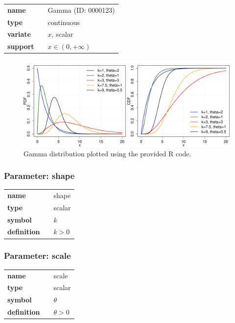 \begin{tabular}{p{2cm}cl}
\textbf{name} & & Gamma (ID: 0000123)\\ 
 
\textbf{type} & & continuous \\ 

\textbf{variate} & & $x$, scalar \\ 

\textbf{support} & & $x \in (0,+\infty)$
\end{tabular}

\begin{figure}[ht!]
\centering
  \includegraphics[width=140mm]{pics/Gamma.pdf}
 \caption{Gamma distribution plotted using the provided R code.}
 \label{fig:Gamma}
\end{figure}

\subsubsection*{Parameter: shape}

\noindent\begin{tabular}{p{2cm}cl}
\textbf{name} & & shape \\
\textbf{type} & & scalar \\
\textbf{symbol} & & $k$  \\
\textbf{definition} & & $k > 0$
\end{tabular}
\subsubsection*{Parameter: scale}

\noindent\begin{tabular}{p{2cm}cl}
\textbf{name} & & scale \\
\textbf{type} & & scalar \\
\textbf{symbol} & & $\theta$  \\
\textbf{definition} & & $\theta > 0$
\end{tabular}
